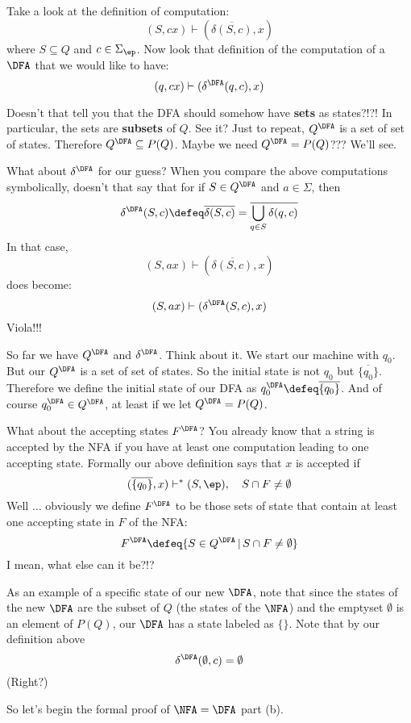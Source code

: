 Take a look at the definition of computation:
\[
 (S,cx) \vdash (\overline{\delta(S,c)}, x)
\]
where $S \subseteq Q$ and $c \in \Sigma_\ep$.
Now look that definition of the computation of a $\DFA$
that we would like to have:
\[
 (q,cx) \vdash (\delta^{\DFA}(q,c),x)
\]

Doesn't that tell you that the DFA should somehow have
\textbf{sets}
as states?!?! In particular, the sets are
\textbf{subsets} of
$Q$. See it? Just to repeat, $Q^{\DFA}$ is a set of set of states.
Therefore $Q^{\DFA} \subseteq P(Q)$. Maybe we need $Q^{\DFA} =
P(Q)$??? We'll see.

What about $\delta^{\DFA}$ for our guess? When you compare the above
computations symbolically, doesn't that say that for if $S \in
Q^{\DFA}$ and $a\in \Sigma$, then
\[
 \delta^{\DFA}(S,c) 
\defeq \overline{\delta(S,c)}
= \overline{\bigcup_{q \in S} \delta(q,c)}
\]
In that case,
\[
 (S,ax) \vdash (\overline{\delta(S,c)}, x)
\]
does become:
\[
 (S,ax) \vdash (\delta^{\DFA}(S,c), x)
\]
Viola!!!

So far we have $Q^{\DFA}$ and $\delta^{\DFA}$. Think about it. We
start our machine with $q_0$. But our $Q^{\DFA}$ is a set of set of
states. So the initial state is not $q_0$ but $\overline{\{q_0\}}$. 
Therefore
we define the initial state of our DFA as $q_0^{\DFA} \defeq
\overline{\{q_0\}}$. 
And of course $q_0^{\DFA} \in Q^{\DFA}$, at least if we let
$Q^{\DFA} = P(Q)$.

What about the accepting states $F^{\DFA}$? You already know that a
string is accepted by the NFA if you have at least one computation
leading to one accepting state. Formally our above definition says
that $x$ is accepted if
\[
 (\overline{\{q_0\}}, x) \vdash^* (S, \ep), \quad S \cap F \neq \emptyset
\]
Well $\ldots$ obviously we define $F^{\DFA}$ to be those sets of
state that contain at least one accepting state in $F$ of the NFA:
\[
 F^{\DFA} \defeq \{S \in Q^{\DFA} \,|\, S \cap F \neq \emptyset \}
\]
I mean, what else can it be?!?

As an example of a specific state of our new $\DFA$,
note that since the states of the new $\DFA$ are the
subset of $Q$ (the states of the $\NFA$)
and the emptyset
$\emptyset$ is an element of $P(Q)$,
our $\DFA$ has a state labeled as $\{\}$.
Note that by our definition above
\[
\delta^{\DFA}(\emptyset, c)
= \emptyset
\]
(Right?)

So let's begin the formal proof of $\NFA=\DFA$ part (b).

